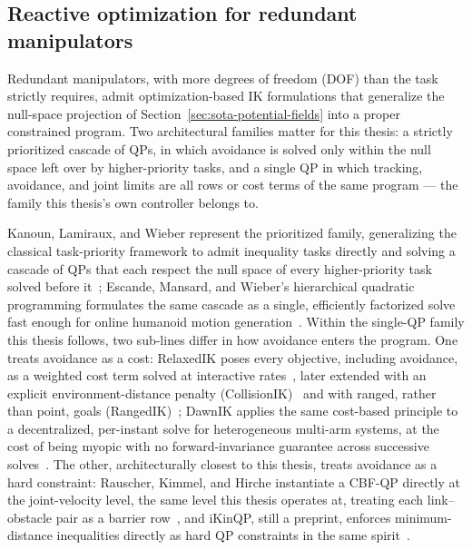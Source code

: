 \subsection{Reactive optimization for redundant manipulators}
\label{sec:sota-optimization-ik}

Redundant manipulators, with more degrees of freedom (DOF) than the task strictly requires, admit optimization-based IK formulations that generalize the null-space projection of Section~\ref{sec:sota-potential-fields} into a proper constrained program. Two architectural families matter for this thesis: a strictly prioritized cascade of QPs, in which avoidance is solved only within the null space left over by higher-priority tasks, and a single QP in which tracking, avoidance, and joint limits are all rows or cost terms of the same program --- the family this thesis's own controller belongs to.

Kanoun, Lamiraux, and Wieber represent the prioritized family, generalizing the classical task-priority framework to admit inequality tasks directly and solving a cascade of QPs that each respect the null space of every higher-priority task solved before it~\cite{kanoun2011kinematic}; Escande, Mansard, and Wieber's hierarchical quadratic programming formulates the same cascade as a single, efficiently factorized solve fast enough for online humanoid motion generation~\cite{escande2014hierarchical}. Within the single-QP family this thesis follows, two sub-lines differ in how avoidance enters the program. One treats avoidance as a cost: RelaxedIK poses every objective, including avoidance, as a weighted cost term solved at interactive rates~\cite{rakita2018relaxedik}, later extended with an explicit environment-distance penalty (CollisionIK)~\cite{rakita2021collisionik} and with ranged, rather than point, goals (RangedIK)~\cite{wang2023rangedik}; DawnIK applies the same cost-based principle to a decentralized, per-instant solve for heterogeneous multi-arm systems, at the cost of being myopic with no forward-invariance guarantee across successive solves~\cite{marangoz2023dawnik}. The other, architecturally closest to this thesis, treats avoidance as a hard constraint: Rauscher, Kimmel, and Hirche instantiate a CBF-QP directly at the joint-velocity level, the same level this thesis operates at, treating each link--obstacle pair as a barrier row~\cite{rauscher2016constrained}, and iKinQP, still a preprint, enforces minimum-distance inequalities directly as hard QP constraints in the same spirit~\cite{ashkanazy2023ikinqp}.

